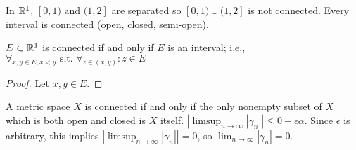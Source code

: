 \begin{example}
	In $\mathbb{R}^{1}$, $[0,1) \text{ and }  (1,2]$ are separated so $[0,1) \cup  (1,2]$ is not connected. Every interval is connected (open, closed, semi-open).
\end{example}

\begin{thm}[47]
	$E \subset \mathbb{R}^{1}$ is connected if and only if $E$ is an interval; i.e., $\forall_{x,y \in E,x<y} \text{ s.t. }  \forall_{z \in (x,y)}:z \in E $
	\begin{proof}
		Let $x,y \in E$.
	\end{proof}
\end{thm}

\begin{thm}
	A metric space $X$ is connected if and only if the only nonempty subset of $X$ which is both open and closed is $X$ itself.
	$|\limsup_{n\to \infty}{|\gamma_n|}|\le 0+\epsilon \alpha$. Since $\epsilon$ is arbitrary, this implies $|\limsup_{n\to \infty}{|\gamma_n|}|=0$, so $\lim_{n\to \infty}{|\gamma_n|}=0$.
\end{thm}

